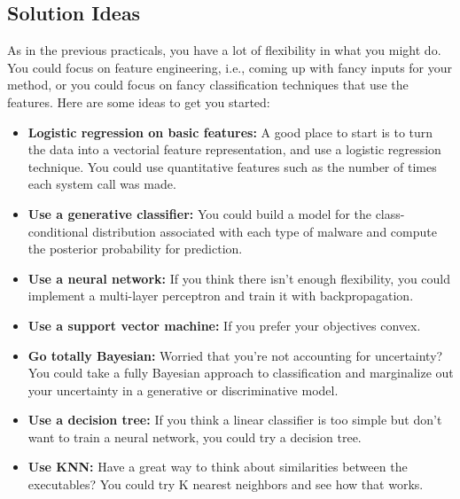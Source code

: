 \documentclass[12pt]{article}
\begin{document}
\subsection*{Solution Ideas}  As in the previous practicals, you have a lot of flexibility in what you might do.  You could focus on feature engineering, i.e., coming up with fancy inputs for your method, or you could focus on fancy classification techniques that use the features.  Here are some ideas to get you started:
\begin{itemize}

    \item \textbf{Logistic regression on basic features:} A good place to start is to turn the data into a vectorial feature representation, and use a logistic regression technique.  You could use quantitative features such as the number of times each system call was made.
        
    \item \textbf{Use a generative classifier:} You could build a model for the class-conditional distribution associated with each type of malware and compute the posterior probability for prediction.
    
    \item \textbf{Use a neural network:} If you think there isn't enough flexibility, you could implement a multi-layer perceptron and train it with backpropagation.
    
    \item \textbf{Use a support vector machine:} If you prefer your objectives convex.
    
    \item \textbf{Go totally Bayesian:} Worried that you're not accounting for uncertainty?  You could take a fully Bayesian approach to classification and marginalize out your uncertainty in a generative or discriminative model.
    
    \item \textbf{Use a decision tree:} If you think a linear classifier is too simple but don't want to train a neural network, you could try a decision tree.
    
    \item \textbf{Use KNN:} Have a great way to think about similarities between the executables?  You could try K nearest neighbors and see how that works.
    
\end{itemize}
\end{document}
